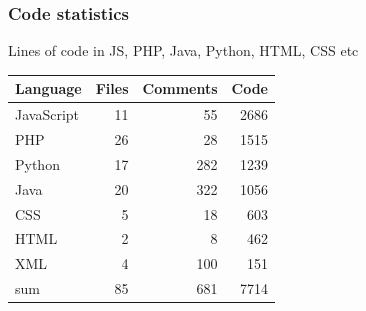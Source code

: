 \subsubsection{Code statistics}
Lines of code in JS, PHP, Java, Python, HTML, CSS etc
\begin{center}
	\begin{tabular}{l r r r}
		\toprule
		\textbf{Language} & \textbf{Files} & \textbf{Comments} & \textbf{Code} \\
		\midrule
		JavaScript & 11 & 55 & 2686 \\ 
		PHP & 26 & 28 & 1515 \\ 
		Python & 17 & 282 & 1239 \\ 
		Java & 20 & 322 & 1056 \\ 
		CSS & 5 & 18 & 603 \\ 
		HTML & 2 & 8 & 462 \\ 
		XML & 4 & 100 & 151 \\ 
		\midrule
		sum & 85 & 681 & 7714 \\ 
		\bottomrule
	\end{tabular}
\end{center}



